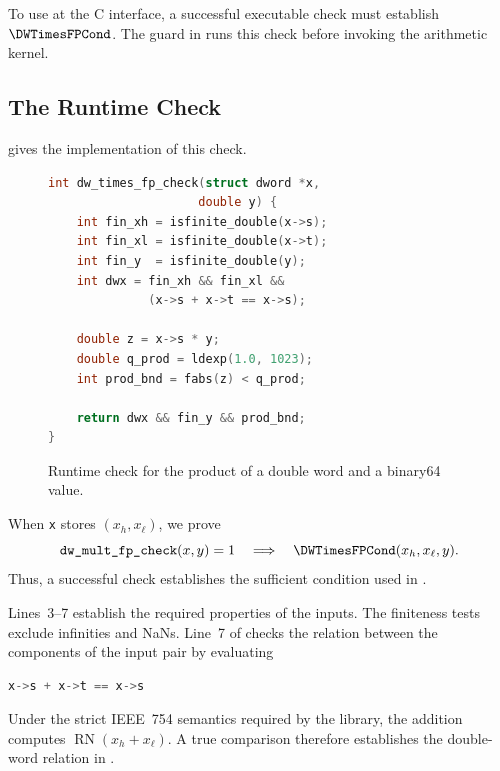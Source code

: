 
To use  at the C interface, a successful
executable check must establish $\DWTimesFPCond$.  The guard in
 runs this check before invoking the arithmetic
kernel.

\subsection{The Runtime Check}
\label{sec:overview-guard}

 gives the implementation of this check.

\begin{figure}[t]
  \begin{lstlisting}[language=C]
int dw_times_fp_check(struct dword *x,
                     double y) {
    int fin_xh = isfinite_double(x->s);
    int fin_xl = isfinite_double(x->t);
    int fin_y  = isfinite_double(y);
    int dwx = fin_xh && fin_xl &&
              (x->s + x->t == x->s);

    double z = x->s * y;
    double q_prod = ldexp(1.0, 1023);
    int prod_bnd = fabs(z) < q_prod;

    return dwx && fin_y && prod_bnd;
}
  \end{lstlisting}
  \caption{Runtime check for the product of a double word and a binary64
  value.}
  \label{fig:dw-times-fp-check}
\end{figure}

When \texttt{x} stores $(x_h,x_\ell)$, we prove
\[
  \texttt{dw\_mult\_fp\_check}(x,y)=1
  \quad\Longrightarrow\quad
  \DWTimesFPCond(x_h,x_\ell,y).
\]
Thus, a successful check establishes the sufficient condition used in
.

Lines~3--7 establish the required properties of the inputs.  The finiteness
tests exclude infinities and NaNs.  Line~7 of
 checks the relation between the components of the
input pair by evaluating
\begin{lstlisting}[language=C,numbers=none,
                   backgroundcolor=\color{gray!5}]
x->s + x->t == x->s
\end{lstlisting}
Under the strict IEEE~754 semantics required by the library, the addition
computes $\operatorname{RN}(x_h+x_\ell)$.  A true comparison therefore
establishes the double-word relation in .

